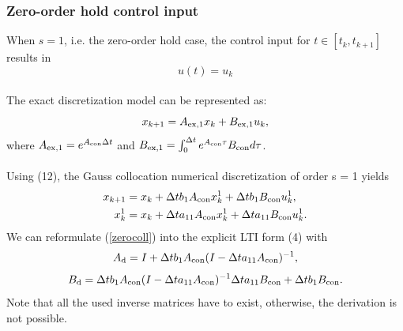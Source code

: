 \subsubsection{Zero-order hold control input}
When $s = 1$, i.e. the zero-order hold case, the control input for $t \in \left[t_k, t_{k+1}\right]$ results in
$$u(t) = u_k$$
\\
The exact discretization model can be represented as:
\begin{equation}
	x_{k+1} = A_{\rm{ex,1}}x_k+B_{\rm{ex,1}}u_k,
\end{equation}
where $A_{\rm{ex,1}} = e^{A_{\rm{con}}  \Delta t}$ and $B_{\rm{ex,1}} = \int_{0}^{\Delta t} e^{A_{\rm{con}}  \tau}  B_{\rm{con}} d \tau$.
\\\\
Using (12), the Gauss collocation numerical discretization of order s = 1 yields
\begin{equation}
	\begin{split}
		x_{k+1}&=x_{k}+\Delta t  b_{1}  A_{\rm{con}}  x_{k}^{1}+\Delta t  b_{1}  B_{\rm{con}}  u_{k}^{1},\\
		x_{k}^{1}&=x_{k}+\Delta t a_{11} A_{\rm{con}} x_{k}^{1}+\Delta t  a_{11} B_{\rm{con}} u_{k}^{1}.
	\end{split}
\label{zerocoll}
\end{equation}
We can reformulate (\ref{zerocoll}) into the explicit LTI form (4)
with
$$
A_{\rm{d}} = I+\Delta t  b_1  A_{\rm{con}}  (I-\Delta t  a_{11}  A_{\rm{con}})^{-1},
$$
$$
B_{\rm{d}} = \Delta t  b_1  A_{\rm{con}}  (I-\Delta t  a_{11}  A_{\rm{con}})^{-1}  \Delta t  a_{11}  B_{\rm{con}} + \Delta t  b_1  B_{\rm{con}}.
$$
Note that all the used inverse matrices have to exist, otherwise, the derivation is not possible.

